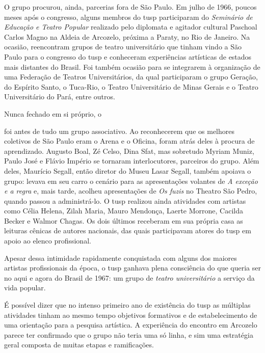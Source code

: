 O grupo procurou, ainda, parcerias fora de São Paulo. Em julho de 1966,
poucos meses após o congresso, alguns membros do {\sc tusp} participaram do
{\it Seminário de Educação e Teatro Popular} realizado pelo diplomata e
agitador cultural Paschoal Carlos Magno na Aldeia de Arcozelo, próxima a
Paraty, no Rio de Janeiro. Na ocasião, reencontram grupos de teatro
universitário que tinham vindo a São Paulo para o congresso do {\sc tusp} e
conheceram experiências artísticas de estados mais distantes do Brasil.
Foi também ocasião para se integrarem à organização de uma Federação de
Teatros Universitários, da qual participaram o grupo Geração, do
Espírito Santo, o Tuca-Rio, o Teatro Universitário de Minas Gerais e o
Teatro Universitário do Pará, entre outros.

Nunca fechado em si próprio, o

\column

 foi antes de tudo um grupo
associativo. Ao reconhecerem que os melhores coletivos de São Paulo eram
o Arena e o Oficina, foram atrás deles à procura de aprendizado. Augusto
Boal, Zé Celso, Dina Sfat, mas sobretudo Myriam Muniz, Paulo José e
Flávio Império se tornaram interlocutores, parceiros do grupo. Além
deles, Maurício Segall, então diretor do Museu Lasar Segall, também
apoiava o grupo: levava em seu carro o cenário para as apresentações
volantes de {\it A exceção e a regra} e, mais tarde, acolheu
apresentações de {\it Os fuzis} no Theatro São Pedro, quando passou a
administrá-lo. O {\sc tusp} realizou ainda atividades com artistas como Célia
Helena, Zilah Maria, Mauro Mendonça, Laerte Morrone, Cacilda Becker e
Walmor Chagas. Os dois últimos receberam em sua própria casa as leituras
cênicas de autores nacionais, das quais participavam atores do {\sc tusp} em
apoio ao elenco profissional.

Apesar dessa intimidade rapidamente conquistada com alguns dos maiores
artistas profissionais da época, o {\sc tusp} ganhava plena consciência do que
queria ser no aqui e agora do Brasil de 1967: um grupo de {\it teatro
universitário} a serviço da vida popular.


\subject{Definição de uma estratégia estético-política}

É possível dizer que no intenso primeiro ano de existência do {\sc tusp} as
múltiplas atividades tinham ao mesmo tempo objetivos formativos e de
estabelecimento de uma orientação para a pesquisa artística. A
experiência do encontro em Arcozelo parece ter confirmado que o grupo
não teria uma só linha, e sim uma estratégia geral composta de muitas
etapas e ramificações.

